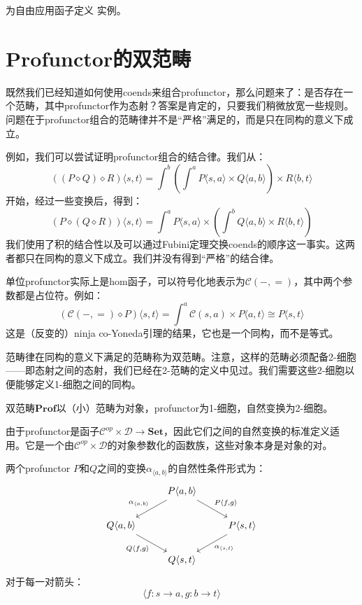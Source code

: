 \documentclass[DaoFP]{subfiles}
\begin{document}
\begin{exercise}
为自由应用函子定义  实例。
\end{exercise}

\section{Profunctor的双范畴}

既然我们已经知道如何使用coends来组合profunctor，那么问题来了：是否存在一个范畴，其中profunctor作为态射？答案是肯定的，只要我们稍微放宽一些规则。问题在于profunctor组合的范畴律并不是“严格”满足的，而是只在同构的意义下成立。

例如，我们可以尝试证明profunctor组合的结合律。我们从：
\[ ((P \diamond Q) \diamond R) \langle s, t \rangle = \int^b \left( \int^a P \langle s, a \rangle \times Q \langle a, b \rangle \right) \times R \langle b,  t \rangle \]
开始，经过一些变换后，得到：
\[ (P \diamond (Q \diamond R)) \langle s, t \rangle =  \int^a P \langle s, a \rangle \times \left( \int^b Q \langle a, b \rangle \times R \langle b,  t \rangle \right) \]
我们使用了积的结合性以及可以通过Fubini定理交换coends的顺序这一事实。这两者都只在同构的意义下成立。我们并没有得到“严格”的结合律。

单位profunctor实际上是hom函子，可以符号化地表示为$\mathcal{C}(-, =)$，其中两个参数都是占位符。例如：
\[ \left( \mathcal{C}(-, =) \diamond P \right) \langle s, t \rangle = \int^a  \mathcal{C}(s, a) \times P \langle a, t \rangle \cong P \langle s, t \rangle \]
这是（反变的）ninja co-Yoneda引理的结果，它也是一个同构，而不是等式。

范畴律在同构的意义下满足的范畴称为双范畴。注意，这样的范畴必须配备2-细胞——即态射之间的态射，我们已经在2-范畴的定义中见过。我们需要这些2-细胞以便能够定义1-细胞之间的同构。

双范畴$\mathbf{Prof}$以（小）范畴为对象，profunctor为1-细胞，自然变换为2-细胞。

由于profunctor是函子$\mathcal{C}^{op} \times  \mathcal{D} \to \mathbf{Set}$，因此它们之间的自然变换的标准定义适用。它是一个由$\mathcal{C}^{op} \times  \mathcal{D}$的对象参数化的函数族，这些对象本身是对象的对。

两个profunctor $P$和$Q$之间的变换$\alpha_{\langle a, b \rangle}$的自然性条件形式为：
\[
 \begin{tikzcd}
 &P \langle a, b \rangle
 \arrow[ld, "{\alpha_{\langle a, b \rangle}}"']
 \arrow[rd, "{P \langle f, g \rangle}"]
 \\
 Q \langle a, b \rangle
 \arrow[dr, "{Q \langle f, g \rangle}"']
 &&P \langle s, t \rangle
 \arrow[dl, "{\alpha_{\langle s, t \rangle}}"]
 \\
 & Q \langle s, t \rangle
 \end{tikzcd}
\]
对于每一对箭头：
\[ \langle f \colon s \to a, g \colon b \to t \rangle \]
\end{document}
